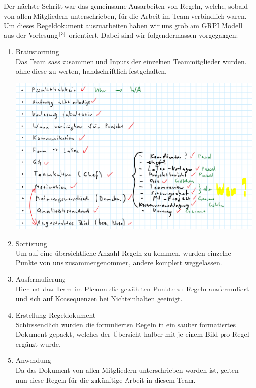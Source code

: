 \documentclass[12pt]{article}
\begin{document}
Der nächste Schritt war das gemeinsame Ausarbeiten von Regeln, welche, sobald von allen Mitgliedern unterschrieben, für die Arbeit im Team verbindlich waren. Um dieses Regeldokument auszuarbeiten haben wir uns grob am GRPI Modell aus der Vorlesung$^{[3]}$ orientiert. Dabei sind wir folgendermassen vorgegangen:
\begin{enumerate}
\item Brainstorming\\
Das Team sass zusammen und Inputs der einzelnen Teammitglieder wurden, ohne diese zu werten, handschriftlich festgehalten.
\begin{center}
\includegraphics[scale=0.3]{regelnHand}
\end{center}
\item Sortierung\\
Um auf eine übersichtliche Anzahl Regeln zu kommen, wurden einzelne Punkte von uns zusammengenommen, andere komplett weggelassen.
\item Ausformulierung\\
Hier hat das Team im Plenum die gewählten Punkte zu Regeln ausformuliert und sich auf Konsequenzen bei Nichteinhalten geeinigt.
\item Erstellung Regeldokument\\
Schlussendlich wurden die formulierten Regeln in ein sauber formatiertes Dokument gepackt, welches der Übersicht halber mit je einem Bild pro Regel ergänzt wurde.
\item Anwendung\\
Da das Dokument von allen Mitgliedern unterschrieben worden ist, gelten nun diese Regeln für die zukünftige Arbeit in diesem Team.

\end{enumerate}
\end{document}
